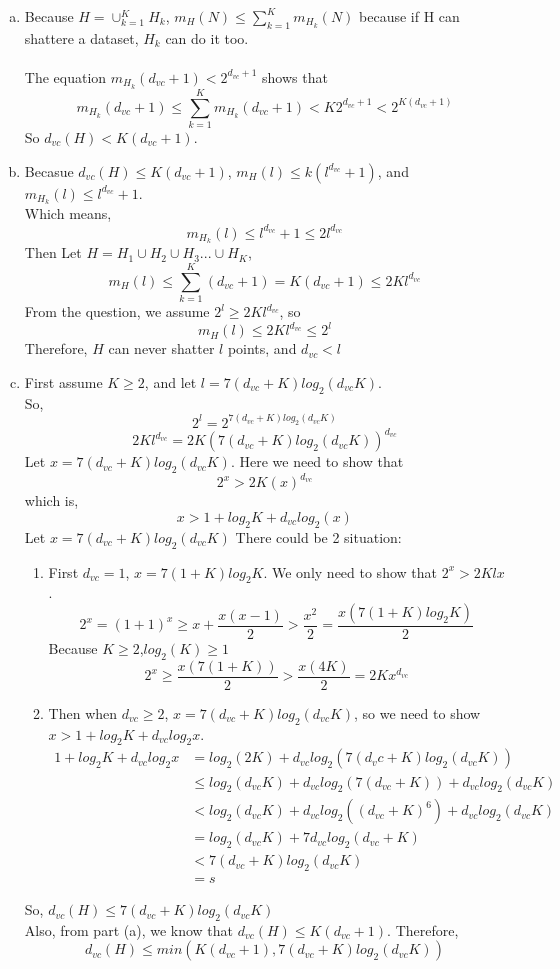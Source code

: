 \documentclass[11pt]{article}
\begin{document}
\begin{enumerate} [(a)]
	\item Because $H=\cup^K_{k=1}H_k$, $m_H(N)\leq\sum^K_{k=1}m_{H_k}(N)$ because if H can shattere a dataset, $H_k$ can do it too.\\
	\\
	The equation $m_{H_k}(d_{vc}+1)<2^{d_{vc}+1}$ shows that \[
		m_{H_k}(d_{vc}+1)\leq \sum^K_{k=1}m_{H_k}(d_{vc}+1)<K2^{d_{vc}+1}<2^{K(d_{vc}+1)}
	\] 
	So $d_{vc}(H)<K(d_{vc}+1)$.

	\item Becasue $d_{vc}(H)\leq K(d_ {vc}+1)$,  $m_H(l)\leq k(l^{d_{vc}}+1)$, and $m_{H_k}(l)\leq l^{d_{vc}}+1$.\\
	Which means,\[
		m_{H_k}(l)\leq l^{d_{vc}}+1 \leq 2l^{d_{vc}}
	\]
	Then Let $H = H_1\cup H_2\cup H_3 ... \cup H_K$,
	\[m_{H}(l)\leq \sum^K_{k=1}(d_{vc}+1) = K(d_{vc}+1) \leq 2Kl^{d_{vc}}\]
	From the question, we assume $2^l\geq2Kl^{d_{vc}}$, so\[
		m_H(l)\leq 2Kl^{d_{vc}}\leq2^l
	\]
	Therefore, $H$ can never shatter $l$ points, and $d_{vc}<l$

	\item First assume $K\geq2$, and let $l = 7(d_{vc}+K)log_2(d_{vc}K)$.\\
	So,\[
		2^l=2^{7(d_{vc}+K)log_2(d_{vc}K)}
	\]\[
		2Kl^{d_{vc}}=2K(7(d_{vc}+K)log_2(d_{vc}K))^{d_{vc}}
	\]
	Let $x = 7(d_{vc}+K)log_2(d_{vc}K)$.
	Here we need to show that\[
		2^{x} >2K(x)^{d_{vc}}
	\]which is, \[
		x>1+log_2K+d_{vc}log_2(x)
	\]
	Let $x = 7(d_{vc}+K)log_2(d_{vc}K)$
	There could be 2 situation:
	\begin{enumerate} [(1)]
		\item First $d_{vc}=1$, $x=7(1+K)log_2K$. We only need to show that $2^x>2Klx$.\\
		\[
			2^x=(1+1)^x\geq x+\frac{x(x-1)}{2}>\frac{x^2}{2}=\frac{x(7(1+K)log_2K)}{2}
		\]
		Because $K\geq2$,$log_2(K)\geq1$\[
			2^x\geq \frac{x(7(1+K))}{2}>\frac{x(4K)}{2}=2Kx^{d_{vc}}
		\]
		\newpage
		\item Then when $d_{vc}\geq2$, $x = 7(d_{vc}+K)log_2(d_{vc}K)$, so we need to show $x>1+log_2K+d_{vc}log_2x$.\\
		\[
			\begin{aligned}
			1+log_2K+d_{vc}log_2x &=log_2(2K)+d_{vc}log_2(7(d_vc+K)log_2(d_{vc}K))\\
			&\leq log_2(d_{vc}K)+d_{vc}log_2(7(d_{vc}+K))+d_{vc}log_2(d_{vc}{K})\\
			&<log_2(d_{vc}K)+d_{vc}log_2((d_{vc}+K)^6)+d_{vc}log_2(d_{vc}K)\\
			&=log_2(d_{vc}K)+7d_{vc}log_2(d_{vc}+K)\\
			&<7(d_{vc}+K)log_2(d_{vc}K)\\
			&=s
			\end{aligned}
		\]
	\end{enumerate}
	So, $d_{vc}(H)\leq 7(d_{vc}+K)log_2(d_{vc}K)$\\
	Also, from part (a), we know that $d_{vc}(H)\leq K(d_{vc}+1)$. Therefore, \[
		d_{vc}(H)\leq min(K(d_{vc}+1),7(d_{vc}+K)log_2(d_{vc}K))	
	\]
\end{enumerate}
\newpage
\end{document}
